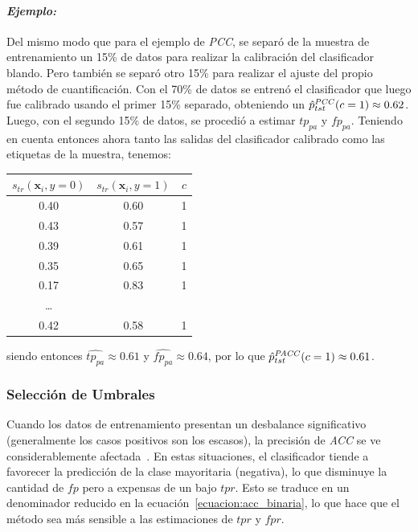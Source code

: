 \paragraph{\it Ejemplo:\/} Del mismo modo que para el ejemplo de {\it PCC}, se
separó de la muestra de entrenamiento un 15\% de datos para realizar la
calibración del clasificador blando. Pero también se separó otro 15\% para
realizar el ajuste del propio método de cuantificación. Con el 70\% de datos se
entrenó el clasificador que luego fue calibrado usando el primer 15\% separado,
obteniendo un $\hat p^{\it PCC\/}_{tst}(c=1) \approx 0.62$. Luego, con el
segundo 15\% de datos, se procedió a estimar $tp_{pa}$ y $fp_{pa}$. Teniendo en
cuenta entonces ahora tanto las salidas del clasificador calibrado como las
etiquetas de la muestra, tenemos:
\begin{center}
    \begin{tabular}{ccc}
        \toprule
        $s_{tr}(\boldsymbol{x}_i, y=0)$ &  $s_{tr}(\boldsymbol{x}_i, y=1)$ & $c$
        \\
        \midrule
        0.40 &    0.60 &  1 \\
        0.43 &    0.57 &  1 \\
        0.39 &    0.61 &  1 \\
        0.35 &    0.65 &  1 \\
        0.17 &    0.83 &  1 \\
        \ldots              \\
        0.42 &    0.58 &  1 \\
     \bottomrule
        \bottomrule
        \end{tabular}
\end{center}

siendo entonces $\hat{tp_{pa}} \approx 0.61$ y $\hat{fp_{pa}} \approx 0.64$, por
lo que $\hat p^{\it PACC\/}_{tst}(c=1) \approx 0.61$.

\subsubsection{Selección de Umbrales}\label{puntual:umbrales}

Cuando los datos de entrenamiento presentan un desbalance significativo
(generalmente los casos positivos son los escasos), la precisión de {\it ACC\/}
se ve considerablemente afectada~\cite{forman2006quantifying}. En estas
situaciones, el clasificador tiende a favorecer la predicción de la clase
mayoritaria (negativa), lo que disminuye la cantidad de $fp$ pero a expensas de
un bajo $tpr$. Esto se traduce en un denominador reducido en la
ecuación~\ref{ecuacion:acc_binaria}, lo que hace que el método sea más sensible
a las estimaciones de $tpr$ y $fpr$.

